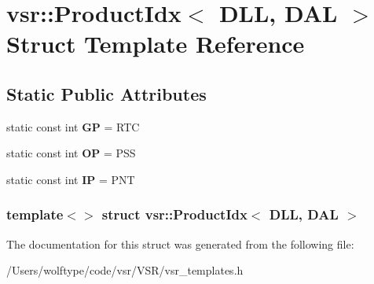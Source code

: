 \hypertarget{structvsr_1_1_product_idx_3_01_d_l_l_00_01_d_a_l_01_4}{\section{vsr\-:\-:Product\-Idx$<$ D\-L\-L, D\-A\-L $>$ Struct Template Reference}
\label{structvsr_1_1_product_idx_3_01_d_l_l_00_01_d_a_l_01_4}
}
\subsection*{Static Public Attributes}
\begin{DoxyCompactItemize}
\item 
\hypertarget{structvsr_1_1_product_idx_3_01_d_l_l_00_01_d_a_l_01_4_a0202ed5df07c3d0a6307e80ad77e4c22}{static const int {\bfseries G\-P} = R\-T\-C}\label{structvsr_1_1_product_idx_3_01_d_l_l_00_01_d_a_l_01_4_a0202ed5df07c3d0a6307e80ad77e4c22}

\item 
\hypertarget{structvsr_1_1_product_idx_3_01_d_l_l_00_01_d_a_l_01_4_a00bdb87e1ee6721507be18d30b33bd89}{static const int {\bfseries O\-P} = P\-S\-S}\label{structvsr_1_1_product_idx_3_01_d_l_l_00_01_d_a_l_01_4_a00bdb87e1ee6721507be18d30b33bd89}

\item 
\hypertarget{structvsr_1_1_product_idx_3_01_d_l_l_00_01_d_a_l_01_4_a3b99a068533232ee75c8fb52354f495e}{static const int {\bfseries I\-P} = P\-N\-T}\label{structvsr_1_1_product_idx_3_01_d_l_l_00_01_d_a_l_01_4_a3b99a068533232ee75c8fb52354f495e}

\end{DoxyCompactItemize}
\subsubsection*{template$<$$>$ struct vsr\-::\-Product\-Idx$<$ D\-L\-L, D\-A\-L $>$}



The documentation for this struct was generated from the following file\-:\begin{DoxyCompactItemize}
\item 
/\-Users/wolftype/code/vsr/\-V\-S\-R/vsr\-\_\-templates.\-h\end{DoxyCompactItemize}
